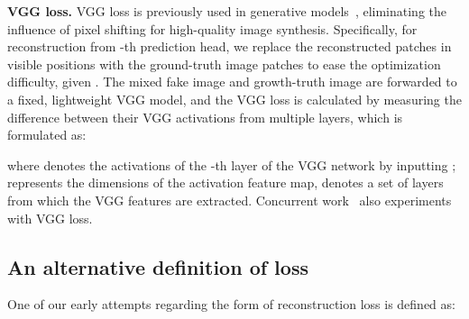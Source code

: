 \documentclass{article}
\begin{document}
\textbf{VGG loss.}
VGG loss is previously used in generative models~\cite{johnson2016perceptual,esser2021taming}, eliminating the influence of pixel shifting for high-quality image synthesis. Specifically, for reconstruction from -th prediction head, we replace the reconstructed patches in visible positions with the ground-truth image patches to ease the optimization difficulty, given . 
The mixed fake image  and growth-truth image  are forwarded to a fixed, lightweight VGG model, and the VGG loss is calculated by measuring the difference between their VGG activations from multiple layers, which is formulated as:

where  denotes the activations of the -th layer of the VGG network by inputting ;  represents the dimensions of the activation feature map,  denotes a set of layers from which the VGG features are extracted. Concurrent work~\cite{dong2021peco} also experiments with VGG loss.

\subsection{An alternative definition of loss } One of our early attempts regarding the form of reconstruction loss is defined as:
\end{document}
